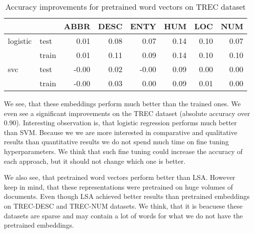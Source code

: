     
    \begin{table}[H]
    \begin{center}
    
    \begin{tabular}{llrrrrrr}
    \toprule
     &&ABBR &DESC &ENTY &HUM &LOC &NUM \\
    \midrule
    logistic & test &0.01 &0.08 &0.07 & 0.14 & 0.10 & 0.07 \\
     & train &0.01 &0.11 &0.09 & 0.14 & 0.10 & 0.10 \\
    svc & test & -0.00 &0.02 & -0.00 & 0.09 & 0.00 & 0.00 \\
     & train & -0.00 &0.03 &0.00 & 0.09 & 0.01 & 0.00 \\
    \bottomrule
    \end{tabular}
    
    \caption[Accuracy improvements for pretrained word vectors on TREC dataset]{Accuracy improvements for pretrained word vectors on TREC dataset}
    \label{tab:res:pretrainedwordvec:trec}
    \end{center}
    \end{table}

    
    We see, that these embeddings perform much better than the trained ones. 
    We even see a significant improvements on the TREC dataset (absolute accuracy over $0.90$).
    Interesting observation is, that logistic regression performs much better than SVM.
    Because we we are more interested in comparative and qualitative results than quantitative results we do not spend much time on fine tuning hyperparameters. We think that such fine tuning could increase the accuracy of each approach, but it should not change which one is better. 
    
    We also see, that pretrained word vectors perform better than LSA. 
    However keep in mind, that these representations were pretrained on huge volumes of documents.
    Even though LSA achieved better results than pretrained embeddings on TREC-DESC and TREC-NUM datasets.
    We think, that it is beacuese these datasets are sparse and may contain a lot of words for what we do not have the pretrained embeddings.
    
